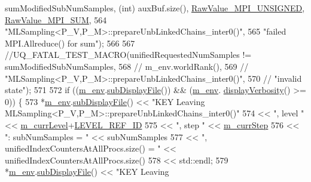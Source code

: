 \begin{DoxyCode}
      sumModifiedSubNumSamples, (\textcolor{keywordtype}{int}) auxBuf.size(), \hyperlink{_mpi_comm_8h_a06cbfbc33436f6e0dc8a48ff3c49bdfc}{RawValue\_MPI\_UNSIGNED}, 
      \hyperlink{_mpi_comm_8h_afbf78d291c032aa7f512bc566cee2bd1}{RawValue\_MPI\_SUM},
564                                \textcolor{stringliteral}{"MLSampling<P\_V,P\_M>::prepareUnbLinkedChains\_inter0()"},
565                                \textcolor{stringliteral}{"failed MPI.Allreduce() for sum"});
566 
567   \textcolor{comment}{//UQ\_FATAL\_TEST\_MACRO(unifiedRequestedNumSamples != sumModifiedSubNumSamples,}
568   \textcolor{comment}{//                    m\_env.worldRank(),}
569   \textcolor{comment}{//                    "MLSampling<P\_V,P\_M>::prepareUnbLinkedChains\_inter0()",}
570   \textcolor{comment}{//                    "invalid state");}
571 
572   \textcolor{keywordflow}{if} ((\hyperlink{class_q_u_e_s_o_1_1_m_l_sampling_a13f1ca4fe9f94822fe572a743eaced1d}{m\_env}.\hyperlink{class_q_u_e_s_o_1_1_base_environment_a8a0064746ae8dddfece4229b9ad374d6}{subDisplayFile}()) && (\hyperlink{class_q_u_e_s_o_1_1_m_l_sampling_a13f1ca4fe9f94822fe572a743eaced1d}{m\_env}.
      \hyperlink{class_q_u_e_s_o_1_1_base_environment_a1fe5f244fc0316a0ab3e37463f108b96}{displayVerbosity}() >= 0)) \{
573     *\hyperlink{class_q_u_e_s_o_1_1_m_l_sampling_a13f1ca4fe9f94822fe572a743eaced1d}{m\_env}.\hyperlink{class_q_u_e_s_o_1_1_base_environment_a8a0064746ae8dddfece4229b9ad374d6}{subDisplayFile}() << \textcolor{stringliteral}{"KEY Leaving
       MLSampling<P\_V,P\_M>::prepareUnbLinkedChains\_inter0()"}
574                             << \textcolor{stringliteral}{", level "}                                   << 
      \hyperlink{class_q_u_e_s_o_1_1_m_l_sampling_af9416874c856e50f3b35270e801f17e4}{m\_currLevel}+\hyperlink{_m_l_sampling_level_options_8h_a68d15eaf394d210effcf584b938206d3}{LEVEL\_REF\_ID}
575                             << \textcolor{stringliteral}{", step "}                                    << 
      \hyperlink{class_q_u_e_s_o_1_1_m_l_sampling_a1b1f8ccb4823bdfa26ec652f0807c63e}{m\_currStep}
576                             << \textcolor{stringliteral}{": subNumSamples = "}                         << subNumSamples
577                             << \textcolor{stringliteral}{", unifiedIndexCountersAtAllProcs.size() = "} << 
      unifiedIndexCountersAtAllProcs.size()
578                             << std::endl;
579     *\hyperlink{class_q_u_e_s_o_1_1_m_l_sampling_a13f1ca4fe9f94822fe572a743eaced1d}{m\_env}.\hyperlink{class_q_u_e_s_o_1_1_base_environment_a8a0064746ae8dddfece4229b9ad374d6}{subDisplayFile}() << \textcolor{stringliteral}{"KEY Leaving
}
\end{DoxyCode}

